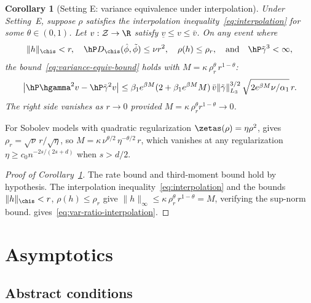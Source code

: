 \documentclass{article}
\newtheorem{corollary}[theorem]{Corollary}
\newcommand{\theoremvariant}[1]{%
  \setcounter{theorem}{\numexpr\variantbase-1\relax}%
  \renewcommand{\thetheorem}{\thesection.\variantbase\textup{#1}}%
}
\newcommand{\resettheorem}{%
  \renewcommand{\thetheorem}{\thesection.\arabic{theorem}}%
}
\begin{document}
\theoremvariant{E}
\begin{corollary}[Setting E: variance equivalence under interpolation]\label{cor:variance-interpolation}
Under Setting~E,
suppose $\rho$ satisfies
the interpolation inequality~\eqref{eq:interpolation}
for some $\theta \in (0,1)$.
Let $v: \mathcal{Z} \to \R$ satisfy $\underline{v} \le v \le \bar{v}$.
On any event where
\[
\|h\|_{\chis} < r, \quad
\hP D_{\chis}(\hat\phi, \tilde\phi) \le \nu r^2, \quad
\rho(h) \le \rho_r, \qqtext{and}
\hP \tilde\gamma^3 < \infty,
\]
the bound~\eqref{eq:variance-equiv-bound} holds with
$M = \kappa\, \rho_r^\theta\, r^{1-\theta}$:
\begin{equation}\label{eq:var-ratio-interpolation}
\abs{\hP \hgamma^2 v - \hP \tilde\gamma^2 v}
  \le \beta_1 e^{\beta M}(2 + \beta_1 e^{\beta M} M)\,
     \bar{v} \|\tilde\gamma\|_{L_3}^{3/2}\, \sqrt{2 e^{\beta M}\nu/\alpha_1}\, r.
\end{equation}
The right side vanishes as $r \to 0$
provided $M = \kappa\, \rho_r^\theta r^{1-\theta} \to 0$.
\end{corollary}

For Sobolev models with quadratic regularization $\zetas(\rho) = \eta\rho^2$,  gives $\rho_r = \sqrt{\nu}\, r/\sqrt{\eta}$, so $M = \kappa\, \nu^{\theta/2}\, \eta^{-\theta/2}\, r$, which vanishes at any regularization $\eta \ge c_0 n^{-2s/(2s+d)}$ when $s > d/2$.

\begin{proof}[Proof of Corollary~\ref{cor:variance-interpolation}]
The rate bound and third-moment bound hold by hypothesis.
The interpolation inequality~\eqref{eq:interpolation}
and the bounds $\|h\|_{\chis} < r$, $\rho(h) \le \rho_r$
give $\|h\|_\infty \le \kappa\, \rho_r^\theta\, r^{1-\theta} = M$,
verifying the sup-norm bound.
 gives~\eqref{eq:var-ratio-interpolation}.
\end{proof}
\resettheorem


\section{Asymptotics}
\label{sec:asymptotics}

\subsection{Abstract conditions}
\label{subsec:abstract-conditions}
\end{document}
